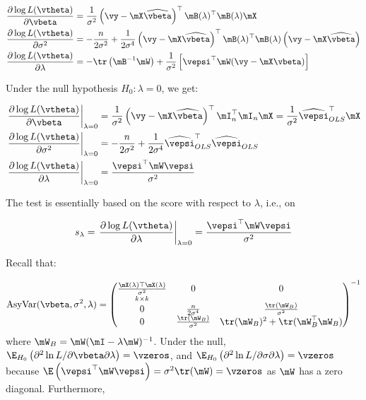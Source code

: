 \documentclass[english,12pt]{book}\usepackage[]{graphicx}\usepackage[]{xcolor}
\begin{document}
\begin{equation}
  \begin{aligned}
\frac{\partial \log L(\vtheta) }{\partial \vbeta}   & = \frac{1}{\sigma^2}\left(\vy - \mX\widehat{\vbeta}\right)^\top\mB(\lambda)^\top\mB(\lambda)\mX \\
\frac{\partial \log L(\vtheta) }{\partial \sigma^2} & = - \frac{n}{2\sigma^2} + \frac{1}{2\sigma^4}\left(\vy - \mX\widehat{\vbeta}\right)^\top\mB(\lambda)^\top\mB(\lambda)\left(\vy - \mX\widehat{\vbeta}\right) \\
\frac{\partial \log L(\vtheta) }{\partial \lambda}  & = -\tr\left(\mB^{-1}\mW\right) + \frac{1}{\sigma^2}\left[\vepsi^\top \mW(\vy - \mX\vbeta)\right] 
 \end{aligned}
\end{equation}

Under the null hypothesis $H_0:\lambda = 0$, we get:

\begin{equation}
  \begin{aligned}
\left.\frac{\partial \log L(\vtheta) }{\partial \vbeta}\right|_{\lambda = 0}   &= \frac{1}{\sigma^2}\left(\vy - \mX\widehat{\vbeta}\right)^\top\mI_n^\top\mI_n\mX = \frac{1}{\sigma^2}\widehat{\vepsi}^\top_{OLS}\mX \\
\left.\frac{\partial \log L(\vtheta) }{\partial \sigma^2}\right|_{\lambda = 0} &=  - \frac{n}{2\sigma^2} + \frac{1}{2\sigma^4}\widehat{\vepsi}^\top_{OLS}\widehat{\vepsi}_{OLS} \\
\left.\frac{\partial \log L(\vtheta)}{\partial \lambda}\right|_{\lambda = 0} &= \frac{\vepsi^\top\mW\vepsi}{\sigma^2}
\end{aligned}
\end{equation}

The test is essentially based on the score with respect to $\lambda$, i.e., on 

\begin{equation}
s_{\lambda} = \left.\frac{\partial \log L(\vtheta) }{\partial \lambda}\right|_{\lambda = 0} = \frac{\vepsi^\top\mW\vepsi}{\sigma^2}
\end{equation}

Recall that:

\begin{equation}
\mbox{AsyVar}(\vbeta, \sigma^2, \lambda)  = 
\begin{pmatrix}
 \underset{k \times k}{\frac{\mX(\lambda)\top\mX(\lambda)}{\sigma^2}} & 0 & 0 \\
  0 & \frac{n}{2\sigma^4} & \frac{\tr(\mW_B)}{\sigma^2} \\
 0 & \frac{\tr(\mW_B)}{\sigma^2} & \tr(\mW_B)^2 + \tr(\mW_B^\top\mW_B)
\end{pmatrix}^{-1}
\end{equation}
%
where $\mW_B = \mW(\mI - \lambda\mW)^{-1}$. Under the null, $\E_{H_0}\left(\partial^2 \ln L / \partial \vbeta \partial \lambda\right) = \vzeros$, and $\E_{H_0}\left(\partial^2 \ln L / \partial \sigma \partial \lambda\right) = \vzeros$ because $\E\left(\vepsi^\top\mW\vepsi\right) = \sigma^2\tr(\mW) = \vzeros$ as $\mW$ has a zero diagonal. Furthermore, 
\end{document}
